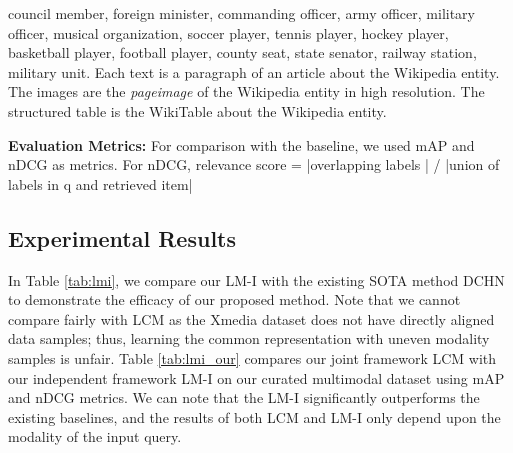 council member, foreign minister, commanding officer, army officer, military officer, musical organization, soccer player, tennis player, hockey player, basketball player, football player, county seat, state senator, railway station, military unit. Each text is a paragraph of an article about the Wikipedia entity. The images are the \textit{pageimage} of the Wikipedia entity in high resolution. The structured table is the WikiTable about the Wikipedia entity.

\noindent\textbf{Evaluation Metrics: }For comparison with the baseline, we used mAP and nDCG as metrics. For nDCG, relevance score = |overlapping labels | / |union of labels in q and retrieved item| 


\subsection{Experimental Results}
In Table \ref{tab:lmi}, we compare our LM-I with the existing SOTA method DCHN \cite{joint} to demonstrate the efficacy of our proposed method. Note that we cannot compare fairly with LCM as the Xmedia dataset does not have directly aligned data samples; thus, learning the common representation with uneven modality samples is unfair. Table \ref{tab:lmi_our} compares our joint framework LCM with our independent framework LM-I on our curated multimodal dataset using mAP and nDCG metrics. We can note that the LM-I significantly outperforms the existing baselines, and the results of both LCM and LM-I only depend upon the modality of the input query. 

